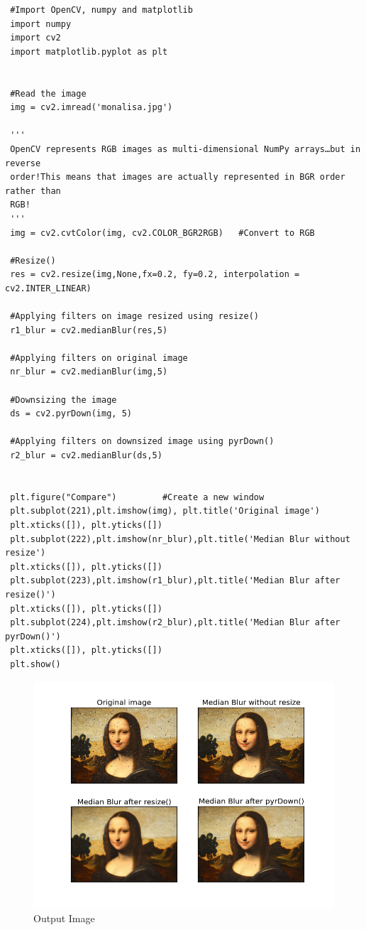 \documentclass[]{article}
\begin{document}
\begin{verbatim}
 #Import OpenCV, numpy and matplotlib
 import numpy
 import cv2
 import matplotlib.pyplot as plt


 #Read the image
 img = cv2.imread('monalisa.jpg')

 '''
 OpenCV represents RGB images as multi-dimensional NumPy arrays…but in reverse
 order!This means that images are actually represented in BGR order rather than
 RGB!
 '''
 img = cv2.cvtColor(img, cv2.COLOR_BGR2RGB)   #Convert to RGB

 #Resize()
 res = cv2.resize(img,None,fx=0.2, fy=0.2, interpolation = cv2.INTER_LINEAR)
 
 #Applying filters on image resized using resize()
 r1_blur = cv2.medianBlur(res,5)

 #Applying filters on original image
 nr_blur = cv2.medianBlur(img,5)

 #Downsizing the image
 ds = cv2.pyrDown(img, 5)

 #Applying filters on downsized image using pyrDown()
 r2_blur = cv2.medianBlur(ds,5)


 plt.figure("Compare")         #Create a new window
 plt.subplot(221),plt.imshow(img), plt.title('Original image')
 plt.xticks([]), plt.yticks([])
 plt.subplot(222),plt.imshow(nr_blur),plt.title('Median Blur without resize')
 plt.xticks([]), plt.yticks([])
 plt.subplot(223),plt.imshow(r1_blur),plt.title('Median Blur after resize()')
 plt.xticks([]), plt.yticks([])
 plt.subplot(224),plt.imshow(r2_blur),plt.title('Median Blur after pyrDown()')
 plt.xticks([]), plt.yticks([])
 plt.show()
\end{verbatim}

\begin{figure}[htbp]
\centering
\includegraphics{compare.png}
\caption{Output Image}
\end{figure}
\end{document}
